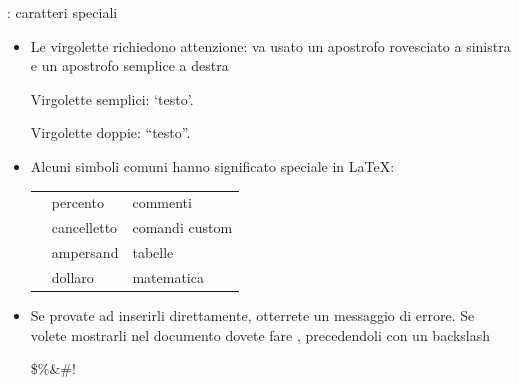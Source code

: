 \documentclass{beamer}
\begin{document}
\begin{frame}[fragile]{\insertsubsection{}: caratteri speciali}
\small
\begin{itemize}
\item Le virgolette richiedono attenzione: va usato un apostrofo rovesciato \keystroke{\`{}} a sinistra e un apostrofo semplice \keystroke{\'{}} a destra
\begin{exampletwouptiny}
Virgolette semplici: `testo'.

Virgolette doppie: ``testo''.
\end{exampletwouptiny}

\item Alcuni simboli comuni hanno significato speciale in \LaTeX:\\[1ex]
\begin{tabular}{cl|l}
\keystrokebftt{\%} & percento    & commenti \\
\keystrokebftt{\#} & cancelletto & comandi custom \\
\keystrokebftt{\&} & ampersand   & tabelle \\
\keystrokebftt{\$} & dollaro     & matematica \\
\end{tabular}
\item Se provate ad inserirli direttamente, otterrete un messaggio di errore.
Se volete mostrarli nel documento dovete fare ,
precedendoli con un backslash \keystrokebftt{\bs}\\
\begin{exampletwouptiny}
\$\%\&\#!
\end{exampletwouptiny}
\end{itemize}

\end{frame}

\end{document}
